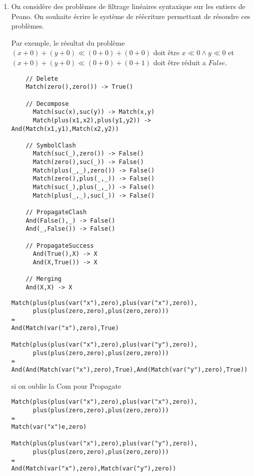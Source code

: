 \documentclass[11pt]{article}
\begin{document}
\begin{enumerate}
\item
On considère des problèmes de filtrage linéaires syntaxique sur les
entiers de Peano. On souhaite écrire le système de réécriture
permettant de résoudre ces problèmes.

Par exemple, le résultat du problème $(x+0)+(y+0) \ll (0+0)+(0+0)$
doit être $x\ll 0 \wedge y\ll 0$ et  $(x+0)+(y+0) \ll (0+0)+(0+1)$
doit être réduit a $False$.

\begin{versionProf}
\begin{verbatim}
    // Delete
    Match(zero(),zero()) -> True()
      
    // Decompose
      Match(suc(x),suc(y)) -> Match(x,y)
      Match(plus(x1,x2),plus(y1,y2)) -> And(Match(x1,y1),Match(x2,y2))
        
    // SymbolClash
      Match(suc(_),zero()) -> False() 
      Match(zero(),suc(_)) -> False() 
      Match(plus(_,_),zero()) -> False() 
      Match(zero(),plus(_,_)) -> False() 
      Match(suc(_),plus(_,_)) -> False() 
      Match(plus(_,_),suc(_)) -> False() 

    // PropagateClash
    And(False(),_) -> False()
    And(_,False()) -> False()

    // PropagateSuccess
      And(True(),X) -> X
      And(X,True()) -> X

    // Merging
    And(X,X) -> X
\end{verbatim}

\begin{verbatim}
Match(plus(plus(var("x"),zero),plus(var("x"),zero)),
      plus(plus(zero,zero),plus(zero,zero)))
= 
And(Match(var("x"),zero),True)

Match(plus(plus(var("x"),zero),plus(var("y"),zero)),
      plus(plus(zero,zero),plus(zero,zero)))
= 
And(And(Match(var("x"),zero),True),And(Match(var("y"),zero),True))
\end{verbatim}
si on oublie la Com pour Propagate

\begin{verbatim}
Match(plus(plus(var("x"),zero),plus(var("x"),zero)),
      plus(plus(zero,zero),plus(zero,zero)))
= 
Match(var("x")e,zero)

Match(plus(plus(var("x"),zero),plus(var("y"),zero)),
      plus(plus(zero,zero),plus(zero,zero)))
= 
And(Match(var("x"),zero),Match(var("y"),zero))
\end{verbatim}
\end{versionProf}


\end{enumerate}
\end{document}
